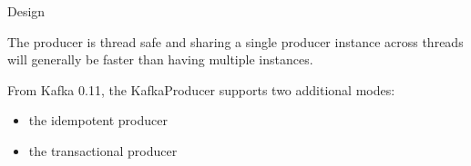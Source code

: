 \begin{frame}[plain,t]{Design} %
     \\
    \vspace{2ex}
    
    The producer is thread safe and sharing a single producer instance across threads will generally be faster than having multiple instances.
    
    \vspace{2ex}
   From Kafka 0.11, the KafkaProducer supports two additional modes: 
   \begin{itemize}
       \item  the idempotent producer
       \item the transactional producer
   \end{itemize}

    
\end{frame}
